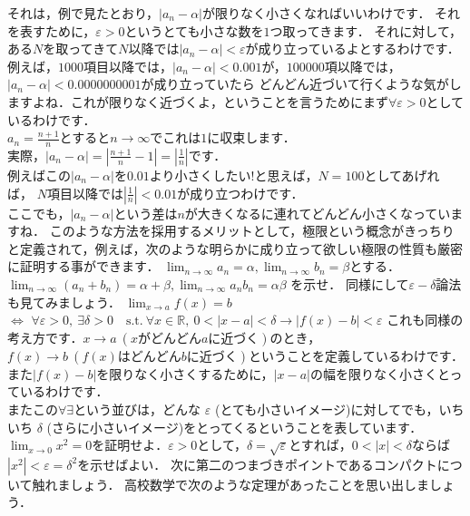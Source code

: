 それは，例で見たとおり，$|a_n - \alpha|$が限りなく小さくなればいいわけです．
それを表すために，$\varepsilon > 0$というとても小さな数を$1$つ取ってきます．
それに対して，ある$N$を取ってきて$N$以降では$|a_n - \alpha | < \varepsilon$が成り立っているよとするわけです．\\
例えば，$1000$項目以降では，$|a_n - \alpha| < 0.001$が，$100000$項以降では，$|a_n - \alpha | < 0.0000000001$が成り立っていたら
どんどん近づいて行くような気がしますよね．これが限りなく近づくよ，ということを言うためにまず$\forall \varepsilon > 0$としているわけです．\\
\ex
$a_n = \frac{n+1}{n}$とすると$n \to \infty $でこれは$1$に収束します．\\
実際，$|a_n - \alpha| = | \frac{n+1}{n} - 1 | = | \frac{1}{n} |$です．\\
例えばこの$|a_n - \alpha|$を$0.01$より小さくしたい!と思えば，$N=100$としてあげれば，
$N$項目以降では$|\frac{1}{n}| < 0.01$が成り立つわけです．\\
ここでも，$|a_n - \alpha| $という差は$n$が大きくなるに連れてどんどん小さくなっていますね．
\exx
このような方法を採用するメリットとして，極限という概念がきっちりと定義されて，例えば，次のような明らかに成り立って欲しい極限の性質も厳密に証明する事ができます．
\prob
$\lim_{n\to\infty} a_n = \alpha , \lim_{n\to\infty} b_n = \beta $とする．\\
$\lim_{n\to\infty} (a_n + b_n) = \alpha + \beta , \lim_{n\to\infty} a_n b_n = \alpha\beta $
を示せ．
\probx
同様にして$\varepsilon-\delta$論法も見てみましょう．
$\lim_{x \to a}f(x) = b$\\
$\iff$
$\forall \varepsilon > 0,\  \exists \delta > 0\quad \textrm{s.t.}\  \forall x \in \mathbb{R},\  0 < |x-a| < \delta \to |f(x)-b| < \varepsilon$
これも同様の考え方です．$x\to a\  (xがどんどんaに近づく)$のとき，$f(x) \to b\  (f(x)はどんどんbに近づく)$ということを定義しているわけです．また$|f(x)-b|$を限りなく小さくするために，$|x-a|$の幅を限りなく小さくとっているわけです．\\
またこの$\forall \exists$という並びは，どんな $\varepsilon$ (とても小さいイメージ)に対してでも，いちいち $\delta$ (さらに小さいイメージ)をとってくるということを表しています．
\prob
$\lim_{x\to 0} x^2 = 0$を証明せよ．$\varepsilon >0$として，$\delta = \sqrt{\varepsilon}$とすれば，$ 0 < | x | < \delta$ならば$ |x^2| < \varepsilon = \delta^2$を示せばよい． 
\probx
{}
次に第二のつまづきポイントであるコンパクトについて触れましょう．
高校数学で次のような定理があったことを思い出しましょう．
